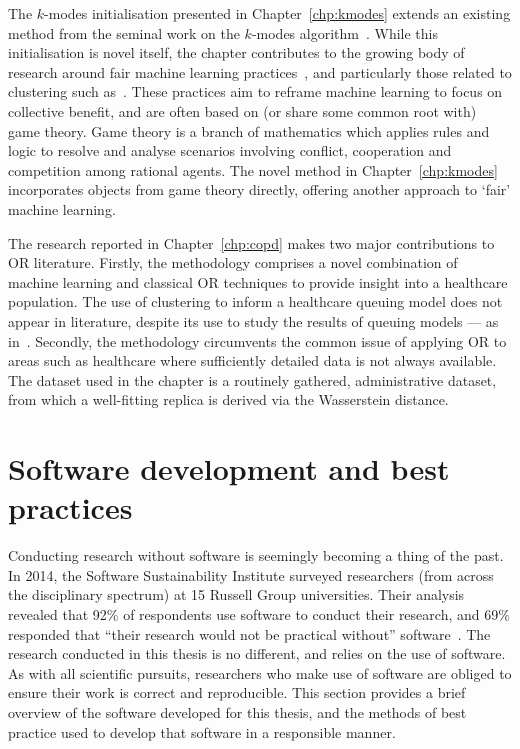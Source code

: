 The \(k\)-modes initialisation presented in Chapter~\ref{chp:kmodes} extends an
existing method from the seminal work on the \(k\)-modes
algorithm~\cite{Huang1998}. While this initialisation is novel itself, the
chapter contributes to the growing body of research around fair machine learning
practices~\cite{Barocas2019,CorbettDavies2018}, and particularly those related
to clustering such as~\cite{Ahmadian2020,Chen2019}. These practices aim to
reframe machine learning to focus on collective benefit, and are often based on
(or share some common root with) game theory. Game theory is a branch of
mathematics which applies rules and logic to resolve and analyse scenarios
involving conflict, cooperation and competition among rational agents. The novel
method in Chapter~\ref{chp:kmodes} incorporates objects from game theory
directly, offering another approach to `fair' machine learning.

The research reported in Chapter~\ref{chp:copd} makes two major contributions to
OR literature. Firstly, the methodology comprises a novel combination of machine
learning and classical OR techniques to provide insight into a healthcare
population. The use of clustering to inform a healthcare queuing model does not
appear in literature, despite its use to study the results of queuing models ---
as in~\cite{Prokofyeva2020,Rebuge2012}. Secondly, the methodology circumvents
the common issue of applying OR to areas such as healthcare where sufficiently
detailed data is not always available. The dataset used in the chapter is a
routinely gathered, administrative dataset, from which a well-fitting replica is
derived via the Wasserstein distance.


\section{Software development and best practices}\label{sec:dev}

Conducting research without software is seemingly becoming a thing of the past.
In 2014, the Software Sustainability Institute surveyed researchers (from across
the disciplinary spectrum) at 15 Russell Group universities. Their analysis
revealed that 92\% of respondents use software to conduct their research, and
69\% responded that ``their research would not be practical without''
software~\cite{Hettrick2014}. The research conducted in this thesis is no
different, and relies on the use of software. As with all scientific pursuits,
researchers who make use of software are obliged to ensure their work is correct
and reproducible. This section provides a brief overview of the software
developed for this thesis, and the methods of best practice used to develop that
software in a responsible manner.

